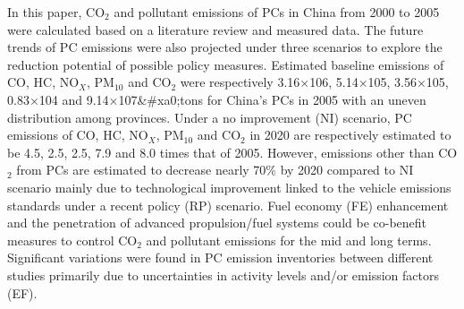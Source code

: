 In this paper, CO$_2$ and pollutant emissions of PCs in China from 2000 to 2005 were calculated based on a literature review and measured data. The future trends of PC emissions were also projected under three scenarios to explore the reduction potential of possible policy measures. Estimated baseline emissions of CO, HC, NO$_X$, PM$_{10}$ and CO$_2$ were respectively 3.16×106, 5.14×105, 3.56×105, 0.83×104 and 9.14×107\&\#xa0;tons for China’s PCs in 2005 with an uneven distribution among provinces. Under a no improvement (NI) scenario, PC emissions of CO, HC, NO$_X$, PM$_{10}$ and CO$_2$ in 2020 are respectively estimated to be 4.5, 2.5, 2.5, 7.9 and 8.0 times that of 2005. However, emissions other than CO$_2$ from PCs are estimated to decrease nearly 70\% by 2020 compared to NI scenario mainly due to technological improvement linked to the vehicle emissions standards under a recent policy (RP) scenario. Fuel economy (FE) enhancement and the penetration of advanced propulsion/fuel systems could be co-benefit measures to control CO$_2$ and pollutant emissions for the mid and long terms. Significant variations were found in PC emission inventories between different studies primarily due to uncertainties in activity levels and/or emission factors (EF).
